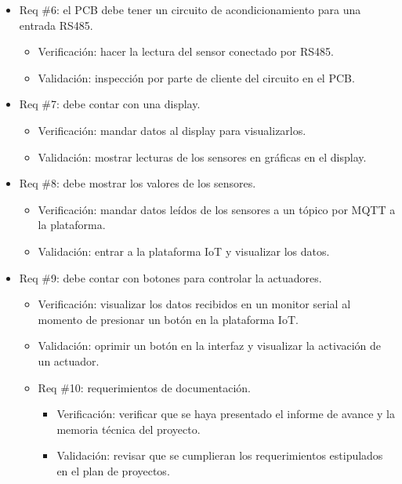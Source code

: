 \documentclass[
11pt, %
codirector, %
]{charter}
\begin{document}
\begin{itemize}
	\item Req \#6: el PCB debe tener un circuito de acondicionamiento para una entrada RS485.
	\begin{itemize}
		\item Verificación: hacer la lectura del sensor conectado por RS485.
		\item Validación: inspección por parte de cliente del circuito en el PCB.  
	\end{itemize}

	\item Req \#7: debe contar con una display.
	\begin{itemize}
		\item Verificación: mandar datos al display para visualizarlos.
		\item Validación: mostrar lecturas de los sensores en gráficas en el display.  
	\end{itemize}

	\item Req \#8: debe mostrar los valores de los sensores.
	\begin{itemize}
		\item Verificación: mandar datos leídos de los sensores a un tópico por MQTT a la plataforma.
		\item Validación: entrar a la plataforma IoT y visualizar los datos. 
	\end{itemize}

	\item Req \#9: debe contar con botones para controlar la actuadores.
	\begin{itemize}
		\item Verificación: visualizar los datos recibidos en un monitor serial al momento de presionar un botón en la plataforma IoT.
		\item Validación: oprimir un botón en la interfaz y visualizar la activación de un actuador. 

	\item Req \#10: requerimientos de documentación.
	\begin{itemize}
		\item Verificación: verificar que se haya presentado el informe de avance y la memoria técnica del proyecto.
		\item Validación: revisar que se cumplieran los requerimientos estipulados en el plan de proyectos. 
	\end{itemize}
\end{itemize}
\end{itemize}
\end{document}
